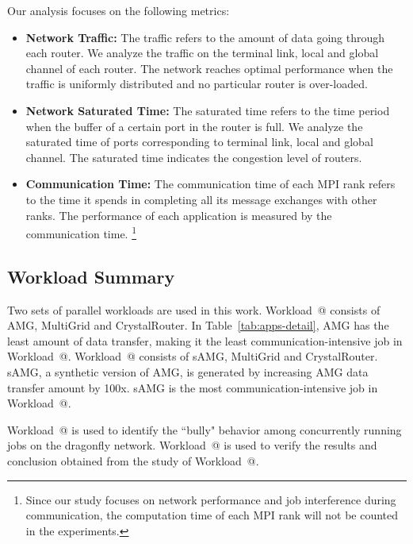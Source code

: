\documentclass[conference,compsoc]{IEEEtran}
\makeatletter
\newcommand{\Rmnum}[1]{\expandafter\@slowromancap\romannumeral #1@}
\makeatother
\begin{document}
Our analysis focuses on the following metrics:
\begin{itemize}

    \item \textbf{Network Traffic:} The traffic refers to the amount of data going through each router. We analyze the traffic on the terminal link, local and global channel of each router. The network reaches optimal performance when the traffic is uniformly distributed and no particular router is over-loaded. 
            
    \item \textbf{Network Saturated Time:} The saturated time refers to the time period when the buffer of a certain port in the router is full. We analyze the saturated time of ports corresponding to terminal link, local and global channel. The saturated time indicates the congestion level of routers. 
    
    \item \textbf{Communication Time:} The communication time of each MPI rank refers to the time it spends in completing all its message exchanges with other ranks. The performance of each application is measured by the communication time.  
\footnote{Since our study focuses on network performance and job interference during communication, the computation time of each MPI rank will not be counted in the experiments.
}

\end{itemize}



\subsection{Workload Summary}
\label{sec:workload summary}

Two sets of parallel workloads are used in this work. Workload~\Rmnum{1} consists of AMG, MultiGrid and CrystalRouter. In Table~\ref{tab:apps-detail}, AMG has the least amount of data transfer, making it the least communication-intensive job in Workload~\Rmnum{1}. Workload~\Rmnum{2} consists of sAMG, MultiGrid and CrystalRouter. sAMG, a synthetic version of AMG, is generated by increasing AMG data transfer amount by 100x. sAMG is the most communication-intensive job in Workload~\Rmnum{2}. 

Workload~\Rmnum{1} is used to identify the ``bully" behavior among concurrently running jobs on the dragonfly network. Workload~\Rmnum{2} is used to verify the results and conclusion obtained from the study of Workload~\Rmnum{1}.
\end{document}
